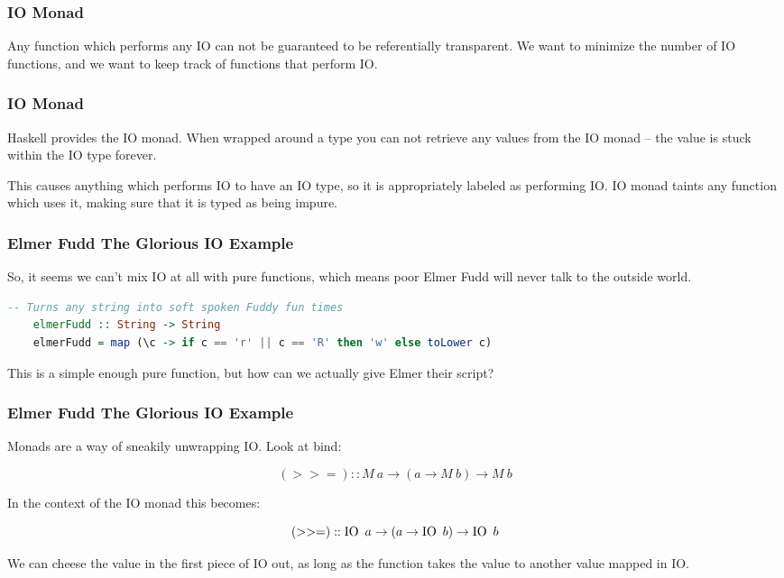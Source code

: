 \documentclass[presentation.tex]{subfiles}
\begin{document}
\begin{frame}[fragile]
  \frametitle{IO Monad}

  Any function which performs any IO can not be guaranteed to be
  referentially transparent. We want to minimize the number of IO
  functions, and we want to keep track of functions that perform IO.
\end{frame}

\begin{frame}[fragile]
  \frametitle{IO Monad}

  Haskell provides the IO monad. When wrapped around a type you can
  not retrieve any values from the IO monad -- the value is stuck
  within the IO type forever.

  This causes anything which performs IO to have an IO type, so it is
  appropriately labeled as performing IO. IO monad taints any function
  which uses it, making sure that it is typed as being impure.
\end{frame}

\begin{frame}[fragile]
  \frametitle{Elmer Fudd The Glorious IO Example}

  So, it seems we can't mix IO at all with pure functions, which means
  poor Elmer Fudd will never talk to the outside world.

  \begin{lstlisting}[frame=single,language=Haskell,breaklines=true]
    -- Turns any string into soft spoken Fuddy fun times
    elmerFudd :: String -> String
    elmerFudd = map (\c -> if c == 'r' || c == 'R' then 'w' else toLower c)
  \end{lstlisting}

  This is a simple enough pure function, but how can we actually give
  Elmer their script?
\end{frame}

\begin{frame}[fragile]
  \frametitle{Elmer Fudd The Glorious IO Example}

  Monads are a way of sneakily unwrapping IO. Look at bind:

  \[(>>=)::M\ a\rightarrow(a\rightarrow M\ b)\rightarrow M\ b\]

  In the context of the IO monad this becomes:

  \[(>>=)::\io\ a\rightarrow(a\rightarrow \io\ b)\rightarrow \io\ b\]

  We can cheese the value in the first piece of IO out, as long as the
  function takes the value to another value mapped in IO.
\end{frame}
\end{document}
